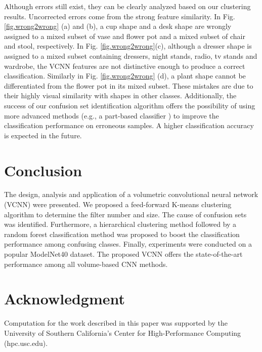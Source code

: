 \documentclass[preprint,12pt]{elsarticle}
\begin{document}
Although errors still exist, they can be clearly analyzed based on our
clustering results. Uncorrected errors come from the strong feature
similarity. In Fig. \ref{fig.wrong2wrong} (a) and (b), a cup shape and a
desk shape are wrongly assigned to a mixed subset of vase and flower pot
and a mixed subset of chair and stool, respectively. In Fig.
\ref{fig.wrong2wrong}(c), although a dresser shape is assigned to a
mixed subset containing dressers, night stands, radio, tv stands and
wardrobe, the VCNN features are not distinctive enough to produce a
correct classification. Similarly in Fig.  \ref{fig.wrong2wrong} (d), a
plant shape cannot be differentiated from the flower pot in its mixed
subset. These mistakes are due to their highly visual similarity with
shapes in other classes. Additionally, the success of our confusion set
identification algorithm offers the possibility of using more advanced
methods (e.g., a part-based classifier \cite{zhang2014part}) to improve
the classification performance on erroneous samples. A higher
classification accuracy is expected in the future. 

\section{Conclusion} \label{sec.conclusion}

The design, analysis and application of a volumetric convolutional
neural network (VCNN) were presented.  We proposed a feed-forward
K-means clustering algorithm to determine the filter number and size.
The cause of confusion sets was identified.  Furthermore, a hierarchical
clustering method followed by a random forest classification method was
proposed to boost the classification performance among confusing
classes. Finally, experiments were conducted on a popular ModelNet40
dataset. The proposed VCNN offers the state-of-the-art performance among
all volume-based CNN methods. 

\section*{Acknowledgment}

Computation for the work described in this paper was supported by the
University of Southern California's Center for High-Performance
Computing (hpc.usc.edu). 


\end{document}
